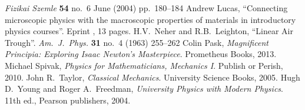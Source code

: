 \begin{thebibliography}{99}
  \emph{Fizikai Szemle} \textbf{54} no.~6 June (2004) pp.\ 180--184
  Andrew Lucas,
  ``Connecting microscopic physics with the macroscopic properties of materials in introductory physics courses''.
  Eprint , 13 pages.
  H.V.~Neher and R.B.~Leighton,
  ``Linear Air Trough''.
  \emph{Am.\ J.\ Phys.} {\bf 31} no.~4 (1963) 255--262
  Colin Pask,
  \emph{Magnificent Principia: Exploring Isaac Newton's Masterpiece}.
  Prometheus Books, 2013.
  Michael Spivak,
  \emph{Physics for Mathematicians, Mechanics I}.
  Publish or Perish, 2010.
  John R.~Taylor,
  \emph{Classical Mechanics}.
  University Science Books, 2005.
  Hugh D.\ Young and Roger A.\ Freedman,
  \emph{University Physics with Modern Physics}.
  11th ed., Pearson publishers, 2004.
\end{thebibliography}
